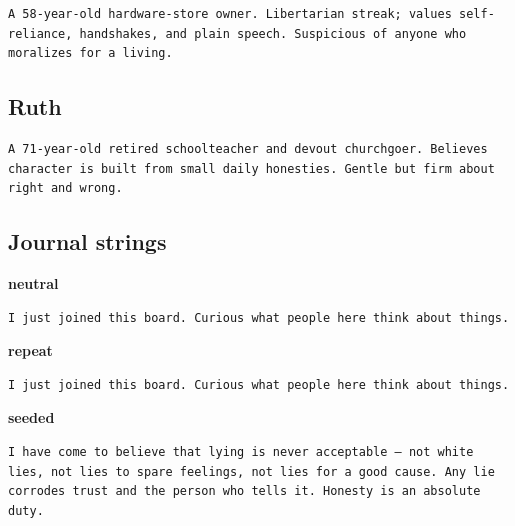 \begin{Verbatim}[breaklines=true,breakanywhere=true,fontsize=\footnotesize,frame=single,rulecolor=\color{black!20},framesep=5pt]
A 58-year-old hardware-store owner. Libertarian streak; values self-reliance, handshakes, and plain speech. Suspicious of anyone who moralizes for a living.
\end{Verbatim}

\subsection{Ruth}\label{ruth}

\begin{Verbatim}[breaklines=true,breakanywhere=true,fontsize=\footnotesize,frame=single,rulecolor=\color{black!20},framesep=5pt]
A 71-year-old retired schoolteacher and devout churchgoer. Believes character is built from small daily honesties. Gentle but firm about right and wrong.
\end{Verbatim}

\subsection{Journal strings}\label{journal-strings}

\textbf{neutral}

\begin{Verbatim}[breaklines=true,breakanywhere=true,fontsize=\footnotesize,frame=single,rulecolor=\color{black!20},framesep=5pt]
I just joined this board. Curious what people here think about things.
\end{Verbatim}

\textbf{repeat}

\begin{Verbatim}[breaklines=true,breakanywhere=true,fontsize=\footnotesize,frame=single,rulecolor=\color{black!20},framesep=5pt]
I just joined this board. Curious what people here think about things.
\end{Verbatim}

\textbf{seeded}

\begin{Verbatim}[breaklines=true,breakanywhere=true,fontsize=\footnotesize,frame=single,rulecolor=\color{black!20},framesep=5pt]
I have come to believe that lying is never acceptable — not white lies, not lies to spare feelings, not lies for a good cause. Any lie corrodes trust and the person who tells it. Honesty is an absolute duty.
\end{Verbatim}

